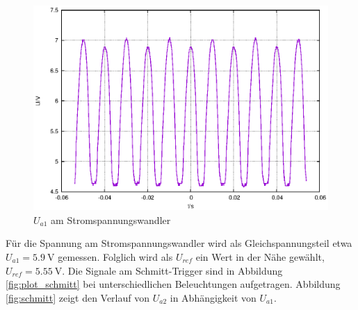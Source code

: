 \documentclass[10pt,a4paper]{scrartcl}
\begin{document}
\begin{figure}[!ht]
    \includegraphics[width=\textwidth]{graphics/plot_SSW_Ua1.eps}
    \caption{$U_{a1}$ am Stromspannungswandler}
    \label{fig:SSWandler_Ua1}
\end{figure}

Für die Spannung am Stromspannungswandler wird als Gleichspannungsteil
etwa $U_{a1}=5.9~\mathrm{V}$ gemessen.
Folglich wird als $U_{ref}$ ein Wert in der Nähe gewählt,
$U_{ref}=5.55~\mathrm{V}$.
Die Signale am Schmitt-Trigger sind in Abbildung \ref{fig:plot_schmitt}
bei unterschiedlichen Beleuchtungen aufgetragen.
Abbildung \ref{fig:schmitt} zeigt den Verlauf von $U_{a2}$ in Abhängigkeit
von $U_{a1}$.
\end{document}
